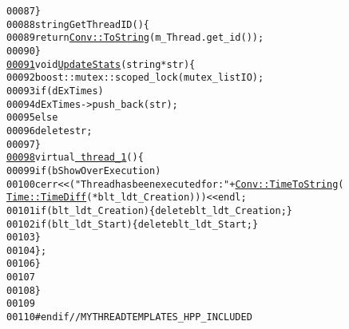 \begin{footnotesize}
\begin{alltt}
00087             \}
00088             \textcolor{keywordtype}{string} GetThreadID()\{
00089                 \textcolor{keywordflow}{return} \hyperlink{group__libbuskol_ga0b261d6de4c26434d56ba40d00daa68a}{Conv::ToString}(m\_Thread.get\_id());
00090             \}
\hypertarget{myThreadTemplates_8hpp_source_l00091}{}\hyperlink{classbuskol_1_1ThreadTemplates_1_1thread__1_ab97928f6c8b8c75b33ffd6e57514d692}{00091}             \textcolor{keywordtype}{void} \hyperlink{classbuskol_1_1ThreadTemplates_1_1thread__1_ab97928f6c8b8c75b33ffd6e57514d692}{UpdateStats}(\textcolor{keywordtype}{string} *str)\{
00092                 boost::mutex::scoped\_lock(mutex\_listIO);
00093                 \textcolor{keywordflow}{if} (dExTimes)
00094                     dExTimes->push\_back(str);
00095                 \textcolor{keywordflow}{else}
00096                     \textcolor{keyword}{delete} str;
00097             \}
\hypertarget{myThreadTemplates_8hpp_source_l00098}{}\hyperlink{classbuskol_1_1ThreadTemplates_1_1thread__1_a7e53c5d7bef0898efc1c1bb217c6319a}{00098}             \textcolor{keyword}{virtual} \hyperlink{classbuskol_1_1ThreadTemplates_1_1thread__1_a7e53c5d7bef0898efc1c1bb217c6319a}{~thread_1}()\{
00099                 \textcolor{keywordflow}{if} (bShowOverExecution)
00100                     cerr<<(\textcolor{stringliteral}{"Thread has been executed for: "}+ \hyperlink{group__libbuskol_ga6c72f99eb28381403eb06abee5ea7c44}{Conv::TimeToString}(
      \hyperlink{group__libbuskol_gac6d1980cc97a5c78f36a3fd96ceaa573}{Time::TimeDiff}(*blt\_ldt\_Creation)))<<endl;
00101                 \textcolor{keywordflow}{if} ( blt\_ldt\_Creation ) \{ \textcolor{keyword}{delete} blt\_ldt\_Creation; \}
00102                 \textcolor{keywordflow}{if} ( blt\_ldt\_Start ) \{ \textcolor{keyword}{delete} blt\_ldt\_Start; \}
00103             \}
00104         \};
00106     \}
00107 
00108 \}
00109 
00110 \textcolor{preprocessor}{#endif // MYTHREADTEMPLATES\_HPP\_INCLUDED}
\end{alltt}\end{footnotesize}
